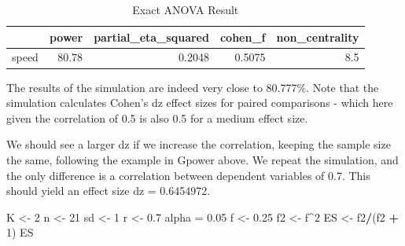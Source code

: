 \documentclass[]{book}
\newenvironment{Shaded}{\begin{snugshade}}{\end{snugshade}}
\newcommand{\DataTypeTok}[1]{\textcolor[rgb]{0.13,0.29,0.53}{#1}}
\newcommand{\DecValTok}[1]{\textcolor[rgb]{0.00,0.00,0.81}{#1}}
\newcommand{\FloatTok}[1]{\textcolor[rgb]{0.00,0.00,0.81}{#1}}
\newcommand{\KeywordTok}[1]{\textcolor[rgb]{0.13,0.29,0.53}{\textbf{#1}}}
\newcommand{\NormalTok}[1]{#1}
\newcommand{\OperatorTok}[1]{\textcolor[rgb]{0.81,0.36,0.00}{\textbf{#1}}}
\newcommand{\OtherTok}[1]{\textcolor[rgb]{0.56,0.35,0.01}{#1}}
\newcommand{\StringTok}[1]{\textcolor[rgb]{0.31,0.60,0.02}{#1}}
\begin{document}
\begin{Shaded}
\end{Shaded}

\begin{table}[t]

\caption{\label{tab:unnamed-chunk-72}Exact ANOVA Result}
\centering
\begin{tabular}{l|r|r|r|r}
\hline
  & power & partial\_eta\_squared & cohen\_f & non\_centrality\\
\hline
speed & 80.78 & 0.2048 & 0.5075 & 8.5\\
\hline
\end{tabular}
\end{table}

The results of the simulation are indeed very close to 80.777\%. Note that the simulation calculates Cohen's dz effect sizes for paired comparisons - which here given the correlation of 0.5 is also 0.5 for a medium effect size.

We should see a larger dz if we increase the correlation, keeping the sample size the same, following the example in Gpower above. We repeat the simulation, and the only difference is a correlation between dependent variables of 0.7. This should yield an effect size dz = 0.6454972.

\begin{Shaded}
\begin{Highlighting}[]
\NormalTok{K <-}\StringTok{ }\DecValTok{2}
\NormalTok{n <-}\StringTok{ }\DecValTok{21}
\NormalTok{sd <-}\StringTok{ }\DecValTok{1}
\NormalTok{r <-}\StringTok{ }\FloatTok{0.7}
\NormalTok{alpha =}\StringTok{ }\FloatTok{0.05}
\NormalTok{f <-}\StringTok{ }\FloatTok{0.25}
\NormalTok{f2 <-}\StringTok{ }\NormalTok{f}\OperatorTok{^}\DecValTok{2}
\NormalTok{ES <-}\StringTok{ }\NormalTok{f2}\OperatorTok{/}\NormalTok{(f2 }\OperatorTok{+}\StringTok{ }\DecValTok{1}\NormalTok{)}
\NormalTok{ES}
\end{Highlighting}
\end{Shaded}
\end{document}
